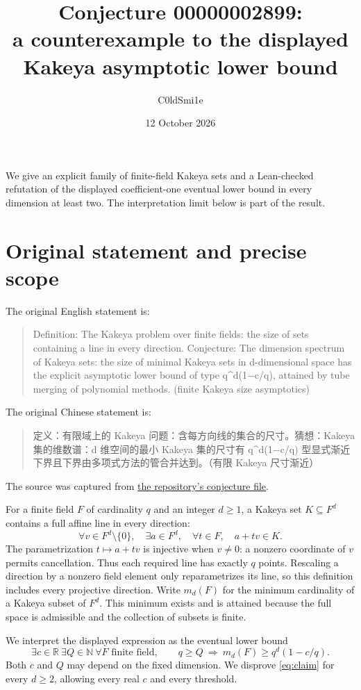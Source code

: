 \documentclass[11pt]{article}
\title{Conjecture 00000002899:\\a counterexample to the displayed\\Kakeya asymptotic lower bound}
\author{C0ldSmi1e}
\date{12 October 2026}
\newcommand{\R}{\mathbb R}
\newcommand{\N}{\mathbb N}
\begin{document}
\maketitle

\noindent We give an explicit family of finite-field Kakeya sets and a Lean-checked
refutation of the displayed coefficient-one eventual lower bound in every
dimension at least two. The interpretation limit below is part of the result.

\section{Original statement and precise scope}
The original English statement is:
\begin{quote}
Definition: The Kakeya problem over finite fields: the size of sets containing
a line in every direction. Conjecture: The dimension spectrum of Kakeya sets:
the size of minimal Kakeya sets in d-dimensional space has the explicit
asymptotic lower bound of type q\textasciicircum d(1−c/q), attained by tube
merging of polynomial methods. (finite Kakeya size asymptotics)
\end{quote}
The original Chinese statement is:
\begin{quote}
定义：有限域上的 Kakeya 问题：含每方向线的集合的尺寸。猜想：Kakeya 集的维数谱：d 维空间的最小 Kakeya 集的尺寸有 q\textasciicircum d(1−c/q) 型显式渐近下界且下界由多项式方法的管合并达到。（有限 Kakeya 尺寸渐近）
\end{quote}
The source was captured from
\href{https://github.com/The-Last-Math-Competition/The-Last-Math-Competition/blob/1e3f7c25616e84b611350a412febceabad75b56a/conjectures/00000002899.md}{the repository's conjecture file}.

For a finite field $F$ of cardinality $q$ and an integer $d\geq 1$, a Kakeya set
$K\subseteq F^d$ contains a full affine line in every direction:
\[
 \forall v\in F^d\setminus\{0\},\quad
 \exists a\in F^d,\quad \forall t\in F,\quad a+tv\in K.
\]
The parametrization $t\mapsto a+tv$ is injective when $v\neq0$: a nonzero
coordinate of $v$ permits cancellation. Thus each required line has exactly
$q$ points. Rescaling a direction by a nonzero field element only
reparametrizes its line, so this definition includes every projective direction.
Write $m_d(F)$ for the minimum cardinality of a Kakeya subset of $F^d$.
This minimum exists and is attained because the full space is admissible and
the collection of subsets is finite.

We interpret the displayed expression as the eventual lower bound
\begin{equation}\label{eq:claim}
 \exists c\in\R\ \exists Q\in\N\ \forall F\text{ finite field},\qquad
 q\geq Q\ \Longrightarrow\ m_d(F)\geq q^d(1-c/q).
\end{equation}
Both $c$ and $Q$ may depend on the fixed dimension. We disprove
\eqref{eq:claim} for every $d\geq2$, allowing every real $c$ and every threshold.
\end{document}
